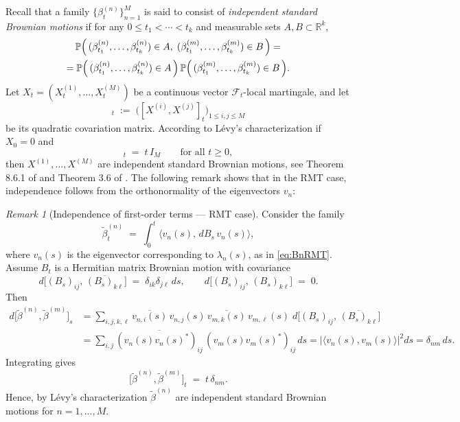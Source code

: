 \documentclass[12pt,reqno]{amsart}
\theoremstyle{plain}
\theoremstyle{definition}
\theoremstyle{remark}
\newtheorem{rem}{Remark}[section]       %
\begin{document}
Recall that a family $\{\beta^{(n)}_t\}_{n=1}^M$ is said to consist of \emph{independent standard Brownian motions} if for any $0\le t_1<\cdots<t_k$ and measurable sets $A,B\subset\mathbb{R}^k$,
\begin{multline}
\mathbb{P}\Bigl(\,(\beta^{(n)}_{t_1},\ldots,\beta^{(n)}_{t_k})\in A,\;(\beta^{(m)}_{t_1},\ldots,\beta^{(m)}_{t_k})\in B\,\Bigr)
=\\=
\mathbb{P}\Bigl(\,(\beta^{(n)}_{t_1},\ldots,\beta^{(n)}_{t_k})\in A\,\Bigr)\,
\mathbb{P}\Bigl(\,(\beta^{(m)}_{t_1},\ldots,\beta^{(m)}_{t_k})\in B\,\Bigr).
\end{multline}
Let $X_t=(X^{(1)}_t,\ldots,X^{(M)}_t)$ be a continuous vector $\mathcal{F}_t$-local martingale, and let
\begin{equation}
[X]_t \;:=\; \bigl([X^{(i)},X^{(j)}]_t\bigr)_{1\le i,j\le M}
\end{equation}
be its quadratic covariation matrix. According to Lévy’s characterization if $X_0=0$ and
\begin{equation}
[X]_t \;=\; t\,I_M \qquad\text{for all } t\ge 0,
\end{equation}
then $X^{(1)},\ldots,X^{(M)}$ are independent standard Brownian motions, see Theorem 8.6.1 of \cite{OK} and Theorem 3.6 of \cite{RY}. The following remark shows that in the RMT case, independence follows from the orthonormality of the eigenvectors $v_n$:

\begin{rem}[Independence of first-order terms — RMT case]\label{prop:5.1}
Consider the family
\begin{equation}
\widetilde{\beta}^{(n)}_t \;=\; \int_0^t \big\langle v_n(s),\, dB_s\, v_n(s) \big\rangle,
\end{equation}
where $v_n(s)$ is the eigenvector corresponding to $\lambda_n(s)$, as in \eqref{eq:BnRMT}.
Assume $B_t$ is a Hermitian matrix Brownian motion with covariance
\begin{equation}
d \bigl[(B_s)_{ij},\,\overline{(B_s)_{k\ell}}\bigr] \;=\; \delta_{ik}\delta_{j\ell}\,ds,
\qquad
d \bigl[(B_s)_{ij},\,(B_s)_{k\ell}\bigr] \;=\; 0 .
\end{equation}
Then
\begin{align}
d\bigl[ \widetilde{\beta}^{(n)}, \widetilde{\beta}^{(m)} \bigr]_s
&= \sum_{i,j,k,\ell} \overline{v_{n,i}(s)}\,v_{n,j}(s)\,\overline{v_{m,k}(s)}\,v_{m,\ell}(s)\;
   d \bigl[(B_s)_{ij},\,\overline{(B_s)_{k\ell}}\bigr] \\
&= \sum_{i,j} \overline{(v_n(s)v_n(s)^{\!*})_{ij}}\,(v_m(s)v_m(s)^{\!*})_{ij}\,ds
 = \bigl|\langle v_n(s),v_m(s)\rangle\bigr|^2 ds
 = \delta_{nm}\,ds .
\end{align}
Integrating gives
\begin{equation}
\label{eq:ortho}
\bigl[ \widetilde{\beta}^{(n)}, \widetilde{\beta}^{(m)} \bigr]_t \;=\; t\,\delta_{nm}.
\end{equation}
Hence, by Lévy’s characterization $\widetilde{\beta}^{(n)}$ are independent standard Brownian motions for $n=1,...,M$.
\end{rem}
\end{document}

